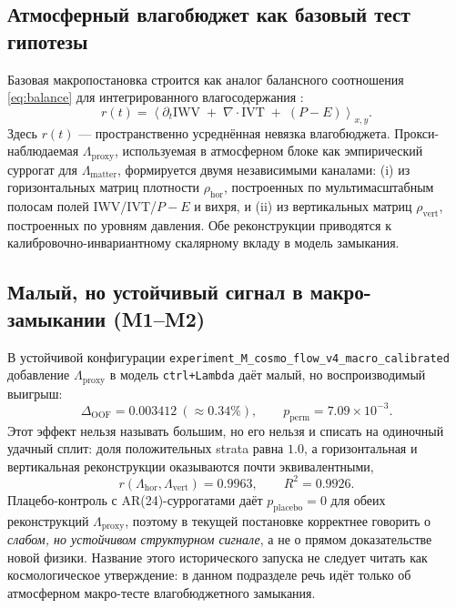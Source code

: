 \documentclass[11pt,a4paper]{article}
\theoremstyle{definition}
\theoremstyle{plain}
\theoremstyle{remark}
\begin{document}
\subsection{Атмосферный влагобюджет как базовый тест гипотезы}

Базовая макропостановка строится как аналог балансного соотношения \eqref{eq:balance}
для интегрированного влагосодержания \cite{PeixotoOort1992PhysicsClimate,TrenberthEtAl2007WaterBudget}:
\begin{equation}
\label{eq:macro_residual}
r(t)=\left\langle
\partial_t\mathrm{IWV}
\;+\;
\nabla\!\cdot\!\mathrm{IVT}
\;+\;
(P-E)
\right\rangle_{x,y}.
\end{equation}
Здесь $r(t)$ --- пространственно усреднённая невязка влагобюджета.
Прокси-наблюдаемая $\Lambda_{\mathrm{proxy}}$, используемая в атмосферном блоке как эмпирический суррогат для $\Lambda_{\mathrm{matter}}$,
формируется двумя независимыми каналами:
(i) из горизонтальных матриц плотности $\rho_{\mathrm{hor}}$, построенных по мультимасштабным полосам полей IWV/IVT/$P\!-\!E$ и вихря,
и (ii) из вертикальных матриц $\rho_{\mathrm{vert}}$, построенных по уровням давления.
Обе реконструкции приводятся к калибровочно-инвариантному скалярному вкладу в модель замыкания.

\subsection{Малый, но устойчивый сигнал в макро-замыкании (M1--M2)}

В устойчивой конфигурации \texttt{experiment\_M\_cosmo\_flow\_v4\_macro\_calibrated}
добавление $\Lambda_{\mathrm{proxy}}$ в модель \texttt{ctrl+Lambda} даёт малый, но воспроизводимый выигрыш:
\[
\Delta_{\mathrm{OOF}} = 0.003412\ (\approx 0.34\%), \qquad p_{\mathrm{perm}} = 7.09\times 10^{-3}.
\]
Этот эффект нельзя называть большим, но его нельзя и списать на одиночный удачный сплит:
доля положительных strata равна $1.0$, а горизонтальная и вертикальная реконструкции оказываются почти эквивалентными,
\[
r(\Lambda_{\mathrm{hor}},\Lambda_{\mathrm{vert}})=0.9963,
\qquad
R^2=0.9926.
\]
Плацебо-контроль с AR(24)-суррогатами даёт $p_{\mathrm{placebo}}=0$ для обеих реконструкций $\Lambda_{\mathrm{proxy}}$,
поэтому в текущей постановке корректнее говорить о \emph{слабом, но устойчивом структурном сигнале},
а не о прямом доказательстве новой физики.
Название этого исторического запуска не следует читать как космологическое утверждение: в данном подразделе речь идёт только об атмосферном макро-тесте влагобюджетного замыкания.
\end{document}
